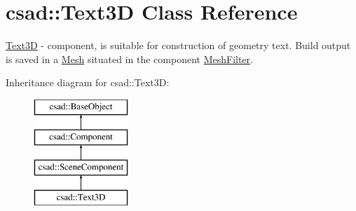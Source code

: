 \hypertarget{classcsad_1_1_text3_d}{\section{csad\-:\-:Text3\-D Class Reference}
\label{classcsad_1_1_text3_d}
}


\hyperlink{classcsad_1_1_text3_d}{Text3\-D} -\/ component, is suitable for construction of geometry text. Build output is saved in a \hyperlink{classcsad_1_1_mesh}{Mesh} situated in the component \hyperlink{classcsad_1_1_mesh_filter}{Mesh\-Filter}.  


Inheritance diagram for csad\-:\-:Text3\-D\-:\begin{figure}[H]
\begin{center}
\leavevmode
\includegraphics[height=4.000000cm]{classcsad_1_1_text3_d}
\end{center}
\end{figure}
